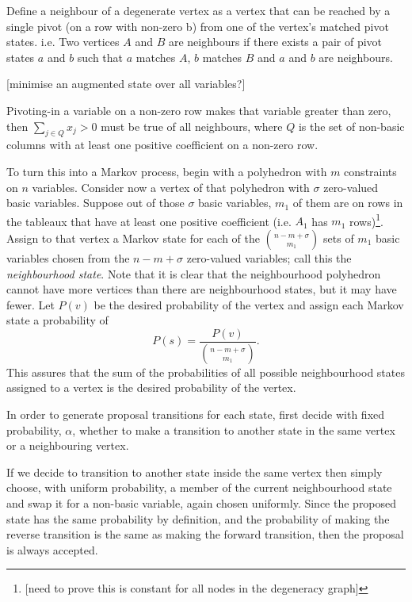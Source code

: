 \documentclass{article}
\begin{document}
 
 

Define a neighbour of a degenerate vertex as a vertex that can be reached by a single pivot (on a row with non-zero b) from one of the vertex's matched pivot states. i.e. Two vertices $A$ and $B$ are neighbours if there exists a pair of pivot states $a$ and $b$ such that $a$ matches $A$, $b$ matches $B$ and $a$ and $b$ are neighbours.

[minimise an augmented state over all variables?]

Pivoting-in a variable on a non-zero row makes that variable greater than zero, then $\sum_{j\in Q} x_j > 0$ must be true of all neighbours, where $Q$ is the set of non-basic columns with at least one positive coefficient on a non-zero row.

To turn this into a Markov process, begin with a polyhedron with $m$ constraints on $n$ variables. Consider now a vertex of that polyhedron with $\sigma$ zero-valued basic variables. Suppose out of those $\sigma$ basic variables, $m_1$ of them are on rows in the tableaux that have at least one positive coefficient (i.e. $A_1$ has $m_1$ rows)\footnote{[need to prove this is constant for all nodes in the degeneracy graph]}. Assign to that vertex a Markov state for each of the $n-m+\sigma \choose m_1$ sets of $m_1$ basic variables chosen from the $n-m+\sigma$ zero-valued variables; call this the \textit{neighbourhood state}. Note that it is clear that the neighbourhood polyhedron cannot have more vertices than there are neighbourhood states, but it may have fewer. Let $P(v)$ be the desired probability of the vertex and assign each Markov state a probability of
\[
P(s) = \frac{P(v)}{\left. n-m+\sigma \choose m_1 \right.}.
\]
This assures that the sum of the probabilities of all possible neighbourhood states assigned to a vertex is the desired probability of the vertex.

In order to generate proposal transitions for each state, first decide with fixed probability, $\alpha$, whether to make a transition to another state in the same vertex or a neighbouring vertex.

If we decide to transition to another state inside the same vertex then simply choose, with uniform probability, a member of the current neighbourhood state and swap it for a non-basic variable, again chosen uniformly. Since the proposed state has the same probability by definition, and the probability of making the reverse transition is the same as making the forward transition, then the proposal is always accepted.
\end{document}
